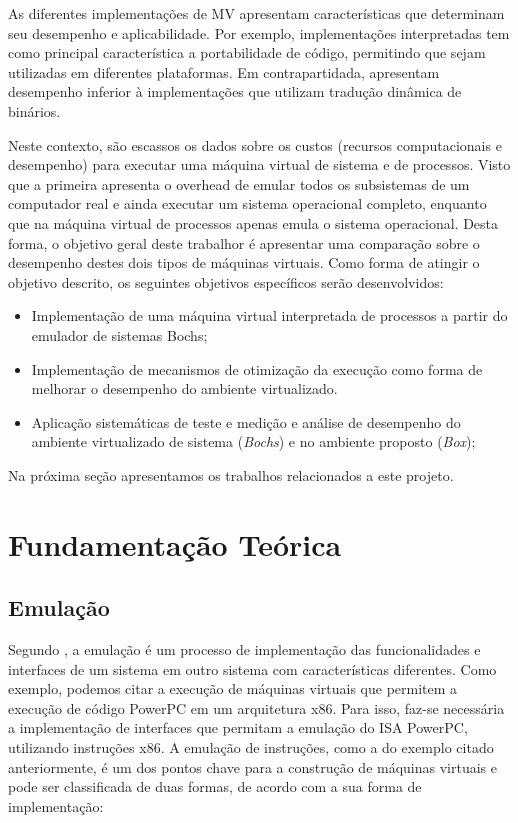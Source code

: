 \documentclass[11pt,twoside]{article}
\begin{document}
As diferentes implementações de MV apresentam características que determinam seu desempenho e aplicabilidade.
Por exemplo, implementações interpretadas tem como principal característica a portabilidade de código, permitindo que sejam utilizadas em diferentes plataformas. 
Em contrapartidada, apresentam desempenho inferior à implementações que utilizam tradução dinâmica de binários.

Neste contexto, são escassos os dados sobre os custos (recursos computacionais e desempenho) para executar uma máquina virtual de sistema e de processos. 
Visto que a primeira apresenta o overhead de emular todos os subsistemas de um computador real e ainda executar um sistema operacional completo, enquanto que na máquina virtual de processos apenas emula o sistema operacional.
Desta forma, o objetivo geral deste trabalhor é apresentar uma comparação sobre o desempenho destes dois tipos de máquinas virtuais.
Como forma de atingir o objetivo descrito, os seguintes objetivos específicos serão desenvolvidos:

\begin{itemize}
 \item Implementação de uma máquina virtual interpretada de processos a partir do emulador de sistemas Bochs;
 \item Implementação de mecanismos de otimização da execução como forma de melhorar o desempenho do ambiente virtualizado.
 \item Aplicação sistemáticas de teste e medição e análise de desempenho do ambiente virtualizado de sistema (\emph{Bochs}) e no ambiente proposto (\emph{Box});
\end{itemize} 

Na próxima seção apresentamos os trabalhos relacionados a este projeto.

\section{Fundamentação Teórica}

 \subsection{Emulação}
Segundo \cite{Smith2005}, a emulação é um processo de implementação das funcionalidades e interfaces de um sistema em outro sistema com características diferentes. 
Como exemplo, podemos citar a execução de máquinas virtuais que permitem a execução de código PowerPC em um arquitetura x86. 
Para isso, faz-se necessária a implementação de interfaces que permitam a emulação do ISA PowerPC, utilizando instruções x86.
A emulação de instruções, como a do exemplo citado anteriormente, é um dos pontos chave para a construção de máquinas virtuais e pode ser classificada de duas formas, de acordo com a sua forma de implementação:
\end{document}
